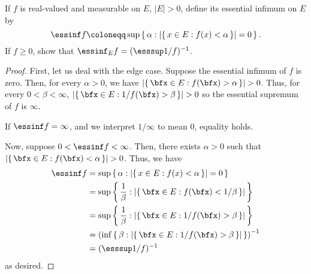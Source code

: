 \begin{problem}
If $f$ is real-valued and measurable on $E$, $|E|>0$, define its essential
infimum on $E$ by
\[
\essinf f\coloneqq\sup\left\{\,\alpha:\left|\{\,x\in
    E:f(x)<\alpha\,\}\right|=0\,\right\}.
\]
If $f\geq 0$, show that $\essinf_E f=(\esssup 1/f)^{-1}$.
\end{problem}
\begin{proof}
First, let us deal with the edge case. Suppose the essential infimum of $f$
is zero. Then, for every $\alpha>0$, we have $\left|\left\{\,\bfx\in
  E:f(\bfx)>\alpha\,\right\}\right|>0$. Thus, for every $0<\beta<\infty$,
$\left|\left\{\,\bfx\in E:1/f(\bfx)>\beta\,\right\}\right|>0$ so the
essential supremum of $f$ is $\infty$.

If $\essinf f=\infty$, and we interpret $1/\infty$ to mean $0$, equality holds.

Now, suppose $0<\essinf f<\infty$. Then, there exists $\alpha>0$ such that
$\left|\left\{\,\bfx\in E:f(\bfx)<\alpha\,\right\}\right|>0$. Thus, we have
\begin{align*}
\essinf f
&=\sup\left\{\,\alpha:\left|\{\,x\in
    E:f(x)<\alpha\,\}\right|=0\,\right\}\\
&=\sup\left\{\,\frac{1}{\beta}:\left|\left\{\,\bfx\in
  E:f(\bfx)<1/\beta\,\right\}\right|\,\right\}\\
&=\sup\left\{\,\frac{1}{\beta}:\left|\left\{\,\bfx\in
  E:1/f(\bfx)>\beta\,\right\}\right|\,\right\}\\
&=\left( \inf \left\{\,\beta:\left|\left\{\,\bfx\in
  E:1/f(\bfx)>\beta\,\right\}\right|\,\right\}\right)^{-1}\\
&=(\esssup 1/f)^{-1}
\end{align*}
as desired.
\end{proof}
\newpage

